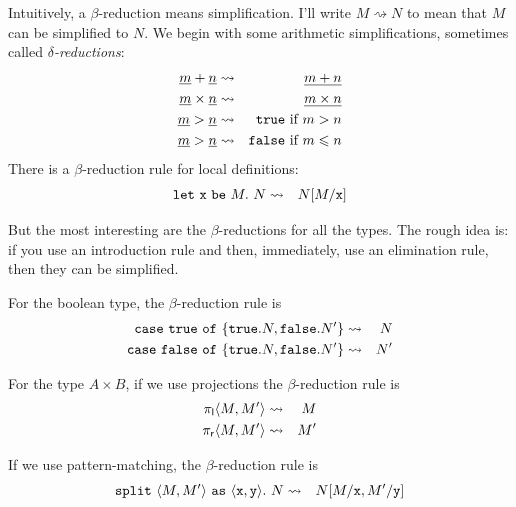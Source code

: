\documentclass[runningheads,12pt]{llncs}
\newcommand{\ttletmac}[2]{\mathtt{let}\ {#2}\ \mathtt{be}\ {#1}.\ }
\newcommand{\ttspof}{\ \mathtt{as}\ }
\newcommand{\projl}{\pi_{\mathsf{l}}}
\newcommand{\projr}{\pi_{\mathsf{r}}}
\begin{document}
Intuitively, a $\beta$-reduction means simplification.  I'll write $M \rightsquigarrow N$ to mean that $M$ can be simplified to $N$.  We begin with some arithmetic simplifications, sometimes called \emph{$\delta$-reductions}:
\begin{eqnarray*}
  \underline{m} + \underline{n} & \rightsquigarrow & \underline{m+n} \\
  \underline{m} \times  \underline{n} & \rightsquigarrow & \underline{m\times n} \\
  \underline{m} > \underline{n} & \rightsquigarrow & \mathtt{true} \mbox{ if $m>n$} \\
 \underline{m} > \underline{n} & \rightsquigarrow & \mathtt{false} \mbox{ if $m\leqslant n$} \\
\end{eqnarray*}
There is a $\beta$-reduction rule for local definitions:
\begin{eqnarray*}
  \ttletmac{ M }{ \ttx } N  & \rightsquigarrow & N[M/\ttx]
\end{eqnarray*} 


But the most interesting are the $\beta$-reductions for all the types.  The rough idea is: if you use an introduction rule and then, immediately, use an elimination rule, then they can be simplified.

For the boolean type, the $\beta$-reduction rule is
\begin{eqnarray*}
  \mathtt{case} \  \mathtt{true} \ \mathtt{of}\  \{ \mathtt{true}. N, \mathtt{false}. N' \} & \rightsquigarrow & N \\
  \mathtt{case} \  \mathtt{false} \ \mathtt{of}\  \{ \mathtt{true}. N, \mathtt{false}. N' \} & \rightsquigarrow & N' 
\end{eqnarray*}

For the type $A \times B$, if we use projections the $\beta$-reduction rule is
\begin{eqnarray*}
  \projl \pair{M}{M'} & \rightsquigarrow & M \\
 \projr \pair{M}{M'} & \rightsquigarrow & M'
\end{eqnarray*}

If we use pattern-matching, the $\beta$-reduction rule is
\begin{eqnarray*}
  \ttsplit \pair{M}{M'} \ttspof \pair{\ttx}{\tty} \ttin N & \rightsquigarrow & N[M/\ttx,M'/\tty]
\end{eqnarray*}
\end{document}

